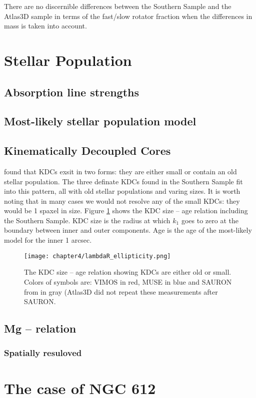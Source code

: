 		There are no discernible differences between the Southern Sample and the Atlas3D sample in terms of the fast/slow rotator fraction when the differences in mass is taken into account. %








\section{Stellar Population}
	\label{sec:pop}

	\subsection{Absorption line strengths}



	\subsection{Most-likely stellar population model}


	\subsection{Kinematically Decoupled Cores}
		\label{sec:popKDC}

		\citet{Kuntschner2010} found that KDCs exsit in two forms: they are either small or contain an old stellar population. The three definate KDCs found in the Southern Sample fit into this pattern, all with old stellar populations and varing sizes. It is worth noting that in many cases we would not resolve any of the small KDCs: they would be 1 spaxel in size. Figure \ref{fig:KDC} shows the KDC size -- age relation including the Southern Sample. KDC size is the radius at which $k_1$ goes to zero at the boundary between inner and outer components. Age is the age of the most-likely model for the inner 1 arcsec. 

		\begin{figure}
			\centering
			\texttt{[image: chapter4/lambdaR\_ellipticity.png]}
			\caption[KDC dichotomy]{The KDC size -- age relation showing KDCs are either old or small. Colors of symbols are: VIMOS in red, MUSE in blue and SAURON from \citet{Kuntschner2010} in gray (Atlas3D did not repeat these measurements after SAURON.}
			\label{fig:KDC}
		\end{figure}


	\subsection{Mg -- \textsigma relation}


		\subsubsection{Spatially resuloved}

\section{The case of NGC 612}
	\label{sec:NGC612}